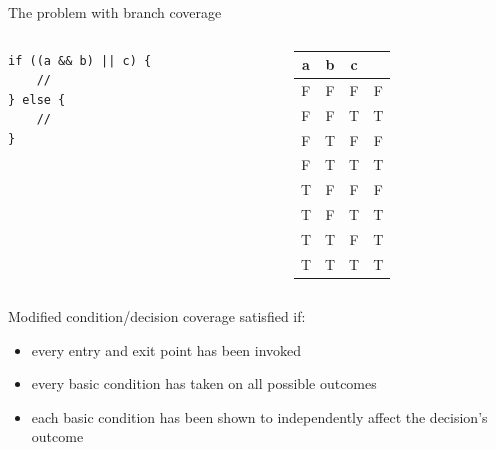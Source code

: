 \documentclass[xcolor = {dvipsnames, table}]{beamer}
\begin{document}
\newcommand \rowhl {\rowcolor{Cyan!20}}

\begin{frame}[fragile]
    The problem with branch coverage
    \begin{columns}
        \begin{column}{0.5\textwidth}
            \begin{lstlisting}
if ((a && b) || c) {
    //
} else {
    //
}
            \end{lstlisting}
        \end{column}

        \begin{column}{0.5\textwidth}
            \begin{tabular}{c c c c}
                        a & b & c \\
                        \hline
                \rowhl  F & F & F & F \\
                \rowhl  F & F & T & T \\
                        F & T & F & F \\
                        F & T & T & T \\
                        T & F & F & F \\
                        T & F & T & T \\
                        T & T & F & T \\
                        T & T & T & T \\
            \end{tabular}
        \end{column}
    \end{columns}
\end{frame}

\begin{frame}
    Modified condition/decision coverage satisfied if:
    \begin{itemize}
        \item every entry and exit point has been invoked
        \item every basic condition has taken on all possible outcomes
        \item each basic condition has been shown to independently affect the
              decision’s outcome
    \end{itemize}
\end{frame}
\end{document}
